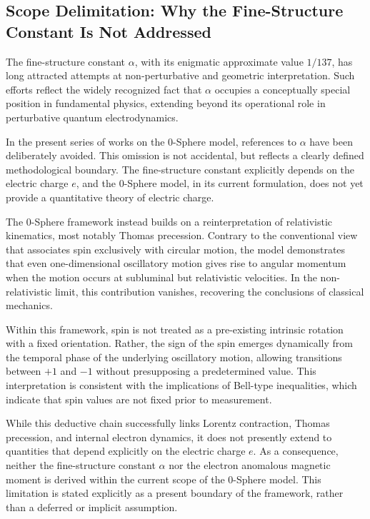 \documentclass[12pt,letterpaper]{article}
\begin{document}
\subsection{Scope Delimitation: Why the Fine-Structure Constant Is Not Addressed}

The fine-structure constant $\alpha$, with its enigmatic approximate value $1/137$, has long attracted attempts at non-perturbative and geometric interpretation. Such efforts reflect the widely recognized fact that $\alpha$ occupies a conceptually special position in fundamental physics, extending beyond its operational role in perturbative quantum electrodynamics.

In the present series of works on the 0-Sphere model, references to $\alpha$ have been deliberately avoided. This omission is not accidental, but reflects a clearly defined methodological boundary. The fine-structure constant explicitly depends on the electric charge $e$, and the 0-Sphere model, in its current formulation, does not yet provide a quantitative theory of electric charge.

The 0-Sphere framework instead builds on a reinterpretation of relativistic kinematics, most notably Thomas precession. Contrary to the conventional view that associates spin exclusively with circular motion, the model demonstrates that even one-dimensional oscillatory motion gives rise to angular momentum when the motion occurs at subluminal but relativistic velocities. In the non-relativistic limit, this contribution vanishes, recovering the conclusions of classical mechanics.

Within this framework, spin is not treated as a pre-existing intrinsic rotation with a fixed orientation. Rather, the sign of the spin emerges dynamically from the temporal phase of the underlying oscillatory motion, allowing transitions between $+1$ and $-1$ without presupposing a predetermined value. This interpretation is consistent with the implications of Bell-type inequalities, which indicate that spin values are not fixed prior to measurement.

While this deductive chain successfully links Lorentz contraction, Thomas precession, and internal electron dynamics, it does not presently extend to quantities that depend explicitly on the electric charge $e$. As a consequence, neither the fine-structure constant $\alpha$ nor the electron anomalous magnetic moment is derived within the current scope of the 0-Sphere model. This limitation is stated explicitly as a present boundary of the framework, rather than a deferred or implicit assumption.
\end{document}
